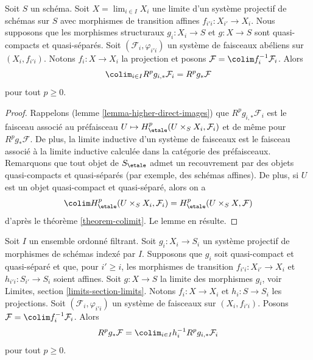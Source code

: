 \begin{lemma}
\label{lemma-relative-colimit}
Soit $S$ un sch\'ema. Soit $X = \lim_{i \in I} X_i$ une limite d'un
syst\`eme projectif de sch\'emas sur $S$ avec morphismes de transition affines
$f_{i'i} : X_{i'} \to X_i$. Nous supposons que les morphismes structuraux
$g_i : X_i \to S$ et $g : X \to S$ sont quasi-compacts et quasi-s\'epar\'es.
Soit $(\mathcal{F}_i, \varphi_{i'i})$ un syst\`eme de faisceaux ab\'eliens
sur $(X_i, f_{i'i})$. Notons $f_i : X \to X_i$ la projection et posons
$\mathcal{F} = \colim f_i^{-1}\mathcal{F}_i$. Alors
$$
\colim_{i\in I} R^p g_{i, *} \mathcal{F}_i = R^p g_* \mathcal{F}
$$
pour tout $p \geq 0$.
\end{lemma}

\begin{proof}
Rappelons (lemme \ref{lemma-higher-direct-images})
que $R^p g_{i, *} \mathcal{F}_i$ est le faisceau associ\'e au
pr\'efaisceau $U \mapsto H^p_\etale(U \times_S X_i, \mathcal{F}_i)$
et de m\^eme pour $R^pg_*\mathcal{F}$. De plus, la limite inductive d'un
syst\`eme de faisceaux est le faisceau associ\'e \`a la limite inductive calcul\'ee dans la cat\'egorie
des pr\'efaisceaux. Remarquons que tout objet de $S_\etale$ admet un recouvrement
par des objets quasi-compacts et quasi-s\'epar\'es (par exemple, des sch\'emas affines).
De plus, si $U$ est un objet quasi-compact et quasi-s\'epar\'e,
alors on a
$$
\colim H^p_\etale(U \times_S X_i, \mathcal{F}_i) =
H^p_\etale(U \times_S X, \mathcal{F})
$$
d'apr\`es le th\'eor\`eme \ref{theorem-colimit}. Le lemme en r\'esulte.
\end{proof}

\begin{lemma}
\label{lemma-relative-colimit-general}
Soit $I$ un ensemble ordonn\'e filtrant. Soit $g_i : X_i \to S_i$ un syst\`eme projectif de
morphismes de sch\'emas index\'e par $I$. Supposons que $g_i$ soit quasi-compact et
quasi-s\'epar\'e et que, pour $i' \geq i$, les morphismes de transition
$f_{i'i} : X_{i'} \to X_i$ et $h_{i'i} : S_{i'} \to S_i$ soient affines.
Soit $g : X \to S$ la limite des morphismes $g_i$, voir
Limites, section \ref{limits-section-limits}.
Notons $f_i : X \to X_i$ et $h_i : S \to S_i$ les projections.
Soit $(\mathcal{F}_i, \varphi_{i'i})$ un syst\`eme de faisceaux
sur $(X_i, f_{i'i})$. Posons $\mathcal{F} = \colim f_i^{-1}\mathcal{F}_i$. Alors
$$
R^p g_* \mathcal{F} =
\colim_{i \in I} h_i^{-1}R^p g_{i, *} \mathcal{F}_i
$$
pour tout $p \geq 0$.
\end{lemma}

